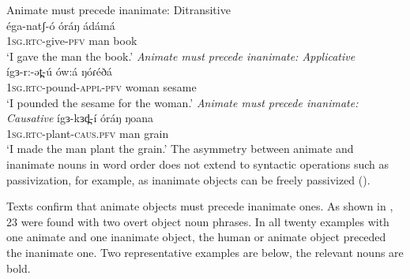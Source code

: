 \ea Animate must precede inanimate: Ditransitive\\ \label{ch12:ex:anina} 
\ea \gll  \'ega-natʃ-\'o \'or\'aŋ ádámá\\
\textsc{1sg.rtc}-give-\textsc{pfv} man book\\
\glt `I gave the man the book.' 
\z 
\ex \textit{Animate must precede inanimate: Applicative}\\ \label{ch12:ex:aninb}
\ea \gll  \'igɜ-r:-ət̪-ú \'ow:\'a ŋóɾéðá\\
\textsc{1sg.rtc}-pound-\textsc{appl-pfv} woman sesame\\
\glt `I pounded the sesame for the woman.' 
\z
\ex \textit{Animate must precede inanimate: Causative}
\ea
\gll  \'igɜ-kɜd̪-\'i óráŋ ŋoana \label{ch12:ex:aninc}\\ 
\textsc{1sg.rtc}-plant-\textsc{caus.pfv} man grain\\
\glt `I made the man plant the grain.' 
\z
\z  
The asymmetry between animate and inanimate nouns in word order does not extend to syntactic operations such as passivization, for example, as inanimate objects can be freely passivized ().

Texts confirm that animate objects must precede inanimate ones. As shown in , 23 were found with two overt object noun phrases. In all twenty examples with one animate and one inanimate object, the human or animate object preceded the inanimate one. Two representative examples are below, the relevant nouns are bold.

